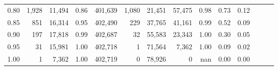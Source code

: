 \begin{tabular}{rrrrrrrrrrrrrr}
0.80 &   1,928 &  11,494 &  0.86 &  401,639 &    1,080 &  21,451 &  57,475 &  0.98 &  0.73 &      0.12 \\
0.85 &     851 &  16,314 &  0.95 &  402,490 &      229 &  37,765 &  41,161 &  0.99 &  0.52 &      0.09 \\
0.90 &     197 &  17,818 &  0.99 &  402,687 &       32 &  55,583 &  23,343 &  1.00 &  0.30 &      0.05 \\
0.95 &      31 &  15,981 &  1.00 &  402,718 &        1 &  71,564 &   7,362 &  1.00 &  0.09 &      0.02 \\
1.00 &       1 &   7,362 &  1.00 &  402,719 &        0 &  78,926 &       0 &   nan &  0.00 &      0.00 \\
\bottomrule
\end{tabular}
